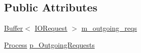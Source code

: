 \subsection*{Public Attributes}
\begin{DoxyCompactItemize}
\item 
\hyperlink{class_simulator_1_1_buffer}{Buffer}$<$ \hyperlink{struct_simulator_1_1drisc_1_1_i_o_bus_interface_1_1_i_o_request}{I\+O\+Request} $>$ \hyperlink{class_simulator_1_1drisc_1_1_i_o_bus_interface_af955888334acc96aaf70483976150641}{m\+\_\+outgoing\+\_\+reqs}
\item 
\hyperlink{class_simulator_1_1_process}{Process} \hyperlink{class_simulator_1_1drisc_1_1_i_o_bus_interface_ac2a130f86754c07a8c863468ab7d1861}{p\+\_\+\+Outgoing\+Requests}
\end{DoxyCompactItemize}


